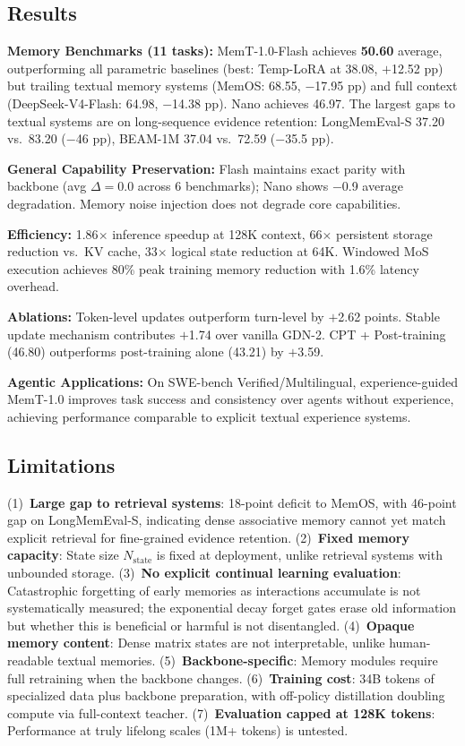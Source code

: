 \documentclass[11pt,a4paper]{article}
\begin{document}
\subsection{Results}
\textbf{Memory Benchmarks (11 tasks):} MemT-1.0-Flash achieves \textbf{50.60} average, outperforming all parametric baselines (best: Temp-LoRA at 38.08, $+$12.52 pp) but trailing textual memory systems (MemOS: 68.55, $-$17.95 pp) and full context (DeepSeek-V4-Flash: 64.98, $-$14.38 pp). Nano achieves 46.97. The largest gaps to textual systems are on long-sequence evidence retention: LongMemEval-S 37.20 vs.\ 83.20 ($-$46 pp), BEAM-1M 37.04 vs.\ 72.59 ($-$35.5 pp).

\textbf{General Capability Preservation:} Flash maintains exact parity with backbone (avg $\Delta{=}0.0$ across 6 benchmarks); Nano shows $-$0.9 average degradation. Memory noise injection does not degrade core capabilities.

\textbf{Efficiency:} 1.86$\times$ inference speedup at 128K context, 66$\times$ persistent storage reduction vs.\ KV cache, 33$\times$ logical state reduction at 64K. Windowed MoS execution achieves 80\% peak training memory reduction with 1.6\% latency overhead.

\textbf{Ablations:} Token-level updates outperform turn-level by $+$2.62 points. Stable update mechanism contributes $+$1.74 over vanilla GDN-2. CPT + Post-training (46.80) outperforms post-training alone (43.21) by $+$3.59.

\textbf{Agentic Applications:} On SWE-bench Verified/Multilingual, experience-guided MemT-1.0 improves task success and consistency over agents without experience, achieving performance comparable to explicit textual experience systems.

\subsection{Limitations}
(1)~\textbf{Large gap to retrieval systems}: 18-point deficit to MemOS, with 46-point gap on LongMemEval-S, indicating dense associative memory cannot yet match explicit retrieval for fine-grained evidence retention. (2)~\textbf{Fixed memory capacity}: State size $N_{\text{state}}$ is fixed at deployment, unlike retrieval systems with unbounded storage. (3)~\textbf{No explicit continual learning evaluation}: Catastrophic forgetting of early memories as interactions accumulate is not systematically measured; the exponential decay forget gates erase old information but whether this is beneficial or harmful is not disentangled. (4)~\textbf{Opaque memory content}: Dense matrix states are not interpretable, unlike human-readable textual memories. (5)~\textbf{Backbone-specific}: Memory modules require full retraining when the backbone changes. (6)~\textbf{Training cost}: 34B tokens of specialized data plus backbone preparation, with off-policy distillation doubling compute via full-context teacher. (7)~\textbf{Evaluation capped at 128K tokens}: Performance at truly lifelong scales (1M+ tokens) is untested.
\end{document}
